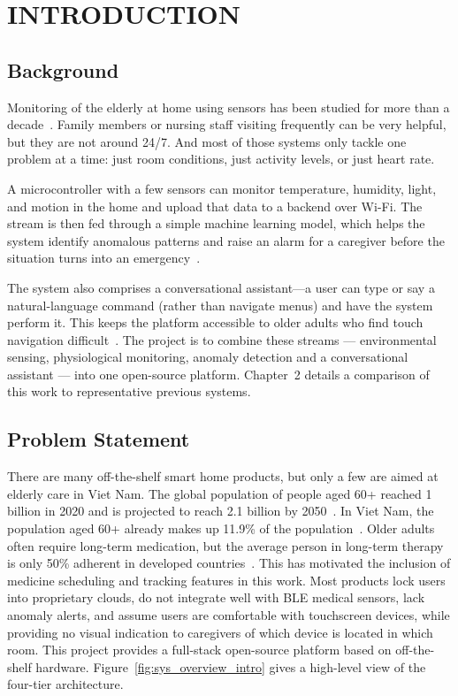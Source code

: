\chapter{INTRODUCTION}

\section{Background}

Monitoring of the elderly at home using sensors has been studied for more than a decade~\cite{Alam2012,Suryadevara2012,Rashidi2013}. Family members or nursing staff visiting frequently can be very helpful, but they are not around 24/7. And most of those systems only tackle one problem at a time: just room conditions, just activity levels, or just heart rate.

A microcontroller with a few sensors can monitor temperature, humidity, light, and motion in the home and upload that data to a backend over Wi-Fi. The stream is then fed through a simple machine learning model, which helps the system identify anomalous patterns and raise an alarm for a caregiver before the situation turns into an emergency~\cite{Chandola2009}.

The system also comprises a conversational assistant---a user can type or say a natural-language command (rather than navigate menus) and have the system perform it. This keeps the platform accessible to older adults who find touch navigation difficult~\cite{Hoy2018}.
The project is to combine these streams --- environmental sensing, physiological monitoring, anomaly detection and a conversational assistant --- into one open-source platform. Chapter~2 details a comparison of this work to representative previous systems.

\section{Problem Statement}

There are many off-the-shelf smart home products, but only a few are aimed at elderly care in Viet Nam. The global population of people aged 60+ reached 1 billion in 2020 and is projected to reach 2.1 billion by 2050~\cite{WHO2022}. In Viet Nam, the population aged 60+ already makes up 11.9\% of the population~\cite{GSO2019}. Older adults often require long-term medication, but the average person in long-term therapy is only 50\% adherent in developed countries~\cite{WHO2003}. This has motivated the inclusion of medicine scheduling and tracking features in this work. Most products lock users into proprietary clouds, do not integrate well with BLE medical sensors, lack anomaly alerts, and assume users are comfortable with touchscreen devices, while providing no visual indication to caregivers of which device is located in which room. This project provides a full-stack open-source platform based on off-the-shelf hardware.
 Figure~\ref{fig:sys_overview_intro} gives a high-level view of the four-tier architecture.


